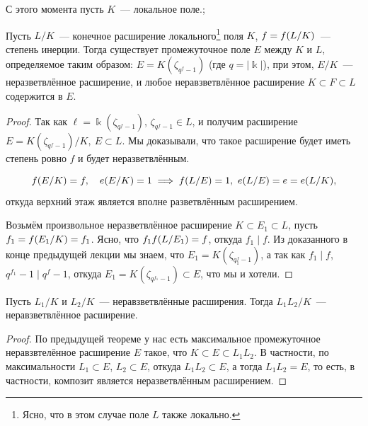    С этого момента пусть $K$~--- локальное поле.; 

	\begin{theorem}\label{max_nerazvetv_ext} 
		Пусть $L/K$~--- конечное расширение локального\footnote{Ясно, что в этом случае поле $L$ также локально.} поля $K$, $f = f\lr*{L/K}$~--- степень инерции. Тогда существует промежуточное поле $E$ между $K$ и $L$, определяемое таким образом: $E = K(\zeta_{q^f - 1})$ (где $q = |\Bbbk|$), при этом, $E/K$~--- неразветвлённое расширение, и любое неравзветвлённое расширение $K \subset F \subset L$ содержится в $E$. 
	\end{theorem}

	\begin{proof}
		Так как $\ell = \Bbbk(\zeta_{q^{f} - 1})$, $\zeta_{q^f - 1} \in L$,  и получим расширение $E = K(\zeta_{q^f  - 1})/K, \ E \subset L$. Мы доказывали, что такое расширение будет иметь степень ровно $f$ и будет неразветвлённым. 

		\[
			f\lr*{E/K} = f, \quad e\lr*{E/K} = 1 \implies f\lr*{L/E} = 1, \ e\lr*{L/E} = e = e\lr*{L/K},
		\]
		откуда верхний этаж является вполне разветвлённым расширением. 

		Возьмём произвольное неразветвлённое расширение $K \subset E_1 \subset L$, пусть $f_1 = f\lr*{E_1/K}  = f_1$. Ясно, что $f_1 f\lr*{L/E_1} = f$, откуда $f_1 \mid f$. Из доказанного в конце предыдущей лекции мы знаем, что $E_1 = K(\zeta_{q^f_{1} - 1})$, а так как $f_1 \mid f$, $q^{f_1} - 1 \mid q^f - 1$, откуда $E_1 = K(\zeta_{q^{f_1} - 1}) \subset E$, что мы и хотели. 
	\end{proof}

	\begin{corollary}
		Пусть $L_1/K$ и $L_2/K$~--- неравзветвлённые расширения. Тогда $L_1 L_2/K$~--- неравзветвлённое расширение. 
	\end{corollary}
	\begin{proof}
		По предыдущей теореме у нас есть максимальное промежуточное неравзвтелённое расширение $E$ такое, что $K \subset E \subset L_1 L_2$. В частности, по максимальности $L_1 \subset E$, $L_2 \subset E$, откуда $L_1 L_2 \subset E$, а тогда $L_1 L_2 = E$, то есть, в частности, композит является неразветвлённым расширением. 
	\end{proof}

